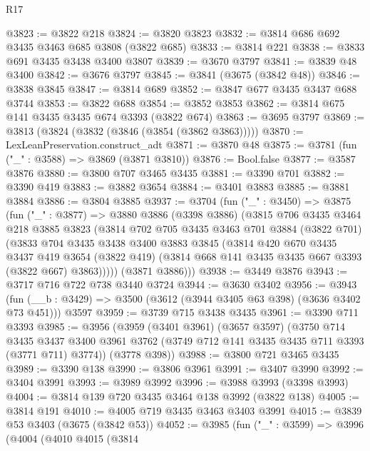 \begin{lexlean}{R17}
\begin{coremodule}
@3823 := @3822 @218
@3824 := @3820 @3823
@3832 := @3814 @686 @692 @3435 @3463 @685 @3808 (@3822 @685)
@3833 := @3814 @221
@3838 := @3833 @691 @3435 @3438 @3400 @3807
@3839 := @3670 @3797
@3841 := @3839 @48 @3400
@3842 := @3676 @3797
@3845 := @3841 (@3675 (@3842 @48))
@3846 := @3838 @3845
@3847 := @3814 @689
@3852 := @3847 @677 @3435 @3437 @688 @3744
@3853 := @3822 @688
@3854 := @3852 @3853
@3862 := @3814 @675 @141 @3435 @3435 @674 @3393 (@3822 @674)
@3863 := @3695 @3797
@3869 := @3813 (@3824 (@3832 (@3846 (@3854 (@3862 @3863)))))
@3870 := LexLeanPreservation.construct_adt
@3871 := @3870 @48
@3875 := @3781 (fun ("_" : @3588) => @3869 (@3871 @3810))
@3876 := Bool.false
@3877 := @3587 @3876
@3880 := @3800 @707 @3465 @3435
@3881 := @3390 @701
@3882 := @3390 @419
@3883 := @3882 @3654
@3884 := @3401 @3883
@3885 := @3881 @3884
@3886 := @3804 @3885
@3937 := @3704
    (fun ("_" : @3450) =>
    @3875
      (fun ("_" : @3877) =>
      @3880
        @3886
        (@3398 @3886)
        (@3815
          @706
          @3435
          @3464
          @218
          @3885
          @3823
          (@3814
            @702
            @705
            @3435
            @3463
            @701
            @3884
            (@3822 @701)
            (@3833
              @704
              @3435
              @3438
              @3400
              @3883
              @3845
              (@3814
                @420
                @670
                @3435
                @3437
                @419
                @3654
                (@3822 @419)
                (@3814 @668 @141 @3435 @3435 @667 @3393 (@3822 @667) @3863)))))
        (@3871 @3886)))
@3938 := @3449 @3876
@3943 := @3717 @716 @722 @738 @3440 @3724
@3944 := @3630 @3402
@3956 := @3943
    (fun (__b : @3429) => @3500 (@3612 (@3944 @3405 @63 @398) (@3636 @3402 @73 @451)))
    @3597
@3959 := @3739 @715 @3438 @3435
@3961 := @3390 @711 @3393
@3985 := @3956
    (@3959
      (@3401 @3961)
      (@3657 @3597)
      (@3750
        @714
        @3435
        @3437
        @3400
        @3961
        @3762
        (@3749 @712 @141 @3435 @3435 @711 @3393 (@3771 @711) @3774))
      (@3778 @398))
@3988 := @3800 @721 @3465 @3435
@3989 := @3390 @138
@3990 := @3806 @3961
@3991 := @3407 @3990
@3992 := @3404 @3991
@3993 := @3989 @3992
@3996 := @3988 @3993 (@3398 @3993)
@4004 := @3814 @139 @720 @3435 @3464 @138 @3992 (@3822 @138)
@4005 := @3814 @191
@4010 := @4005 @719 @3435 @3463 @3403 @3991
@4015 := @3839 @53 @3403 (@3675 (@3842 @53))
@4052 := @3985
    (fun ("_" : @3599) =>
    @3996
      (@4004
        (@4010
          @4015
          (@3814

\end{coremodule}
\end{lexlean}
